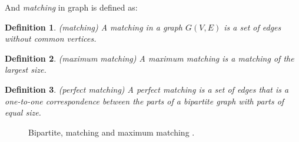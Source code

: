 \documentclass[14pt]{extarticle}
\newtheorem{definition}{Definition}
\begin{document}
And {\it matching} in graph is defined as:

\begin{definition}
  (matching)
  A matching in a graph $G(V,E)$ is a set of edges without common vertices.
\end{definition}

\begin{definition}
  (maximum matching)
  A maximum matching is a matching of the largest size.
\end{definition}

\begin{definition}
  (perfect matching)
  A perfect matching is a set of edges that is a one-to-one correspondence between the parts of a bipartite graph with parts of equal size.
\end{definition}

\begin{figure}[H]
  \centering
  \quad
  \quad
  \caption{Bipartite, matching and maximum matching \cite{coursera}.}
\end{figure}
\end{document}
